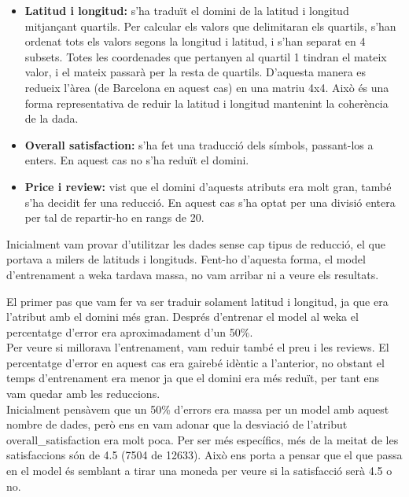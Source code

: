 \documentclass{article}
\begin{document}
\begin{itemize}
	\item \textbf{Latitud i longitud:} s'ha traduït el domini de la latitud i longitud 
	mitjançant quartils.
	Per calcular els valors que delimitaran els quartils, s'han ordenat tots els 
	valors segons la longitud i latitud, i s'han separat en 4 subsets. Totes les 
	coordenades que pertanyen al quartil 1 tindran el mateix valor, i el mateix
	passarà per la resta de quartils.
	D'aquesta manera es redueix l'àrea
	(de Barcelona en aquest cas) en una matriu 4x4. Això és una forma 
	representativa de reduir la latitud i longitud mantenint la coherència de la
	dada.

	\item \textbf{Overall satisfaction:} s'ha fet una traducció dels símbols, 
	passant-los a enters. En aquest cas no s'ha reduït el domini.

	\item \textbf{Price i review:} vist que el domini d'aquests atributs era molt 
	gran, també s'ha decidit fer una reducció. En aquest cas s'ha optat per 
	una divisió entera per tal de repartir-ho en rangs de 20.
\end{itemize}

Inicialment vam provar d'utilitzar les dades sense cap tipus de reducció, el que
portava a milers de latituds i longituds. Fent-ho d'aquesta forma, el model
d'entrenament a weka tardava massa, no vam arribar ni a veure els resultats.

El primer pas que vam fer va ser traduir solament latitud i longitud, ja que era
l'atribut amb el domini més gran. Després d'entrenar el model al weka el
percentatge d'error era aproximadament d'un 50\%.\\

Per veure si millorava l'entrenament, vam reduir també el preu i les reviews. El
percentatge d'error en aquest cas era gairebé idèntic a l'anterior, no obstant
el temps d'entrenament era menor ja que el domini era més reduït, per tant
ens vam quedar amb les reduccions.\\

Inicialment pensàvem que un 50\% d'errors era massa per un model amb aquest nombre
de dades, però ens en vam adonar que la desviació de l'atribut overall\_satisfaction
era molt poca. Per ser més específics, més de la meitat de les satisfaccions són
de 4.5 (7504 de 12633).
Això ens porta a pensar que el que passa en el model és semblant a
tirar una moneda per veure si la satisfacció serà 4.5 o no.
\end{document}
